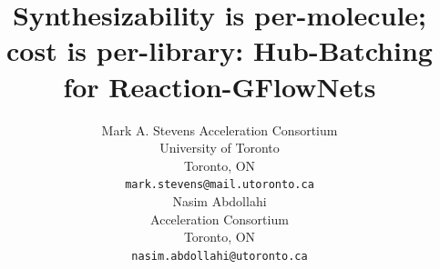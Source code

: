\documentclass{article}
\title{Synthesizability is per-molecule; cost is per-library: Hub-Batching for Reaction-GFlowNets}
\author{%
  Mark A. Stevens
  Acceleration Consortium\\
  University of Toronto\\
  Toronto, ON \\
  \texttt{mark.stevens@mail.utoronto.ca} \\
  \And
  Nasim Abdollahi \\
  Acceleration Consortium \\
  Toronto, ON \\
  \texttt{nasim.abdollahi@utoronto.ca} \\
}
\newcommand{\checkval}[1]{#1}
\begin{document}
\maketitle

\begin{abstract}
%

\end{abstract}
\end{document}
